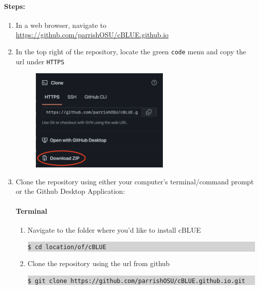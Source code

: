 \documentclass[11pt, a4paper]{article}
\begin{document}
\paragraph{Steps:}
\begin{enumerate}
    \item In a web browser, navigate to \url{https://github.com/parrishOSU/cBLUE.github.io}
    \vspace{1em}
    \item In the top right of the repository, locate the green \texttt{code} menu and copy the url under \texttt{HTTPS}
    
    \begin{figure}[H]
        \centering
        \includegraphics[height=5cm]{figs/cblue_download.png}
    \end{figure}
    \vspace{1em}
    \item Clone the repository using either your computer's terminal/command prompt or the Github Desktop Application:
    \paragraph{Terminal}
    \begin{enumerate}[label=(\alph*)]
        \item Navigate to the folder where you'd like to install cBLUE
        \colorbox{lightgray}{\begin{minipage}{\linewidth}
          \texttt{\$ cd location/of/cBLUE}
        \end{minipage}}
        \vspace{1em}
        \item Clone the repository using the url from github
        \colorbox{lightgray}{\begin{minipage}{\linewidth}
          \texttt{\$ git clone https://github.com/parrishOSU/cBLUE.github.io.git}
        \end{minipage}}
    \end{enumerate}

\end{enumerate}
\end{document}
